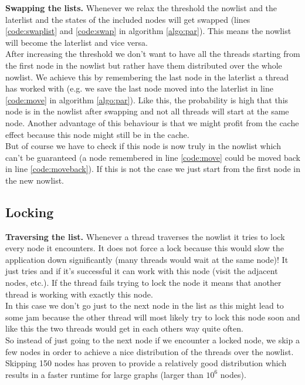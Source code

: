 \documentclass[letterpaper]{article}
\newcommand{\mypar}[1]{{\bf #1.}}
\begin{document}
\mypar{Swapping the lists}
Whenever we relax the threshold the nowlist and the laterlist and the states of the included nodes will get swapped (lines \ref{code:swaplist} and \ref{code:swap} in algorithm \ref{algo:par}). This means the nowlist will become the laterlist and vice versa.\\
After increasing the threshold we don't want to have all the threads starting from the first node in the nowlist but rather have them distributed over the whole nowlist. We achieve this by remembering the last node in the laterlist a thread has worked with (e.g. we save the last node moved into the laterlist in line \ref{code:move} in algorithm \ref{algo:par}). Like this, the probability is high that this node is in the nowlist after swapping and not all threads will start at the same node. Another advantage of this behaviour is that we might profit from the cache effect because this node might still be in the cache. \\
But of course we have to check if this node is now truly in the nowlist which can't be guaranteed (a node remembered in line \ref{code:move} could be moved back in line \ref{code:moveback}). If this is not the case we just start from the first node in the new nowlist.

\subsection{Locking}\label{ssec:lock}

\mypar{Traversing the list}
Whenever a thread traverses the nowlist it tries to lock every node it encounters. It does not force a lock because this would slow the application down significantly (many threads would wait at the same node)! It just tries and if it's successful it can work with this node (visit the adjacent nodes, etc.). If the thread fails trying to lock the node it means that another thread is working with exactly this node.\\
In this case we don't go just to the next node in the list as this might lead to some jam because the other thread will most likely try to lock this node soon and like this the two threads would get in each others way quite often.\\
So instead of just going to the next node if we encounter a locked node, we skip a few nodes in order to achieve a nice distribution of the threads over the nowlist. Skipping 150 nodes has proven to provide a relatively good distribution which results in a faster runtime for large graphs (larger than $10^6$ nodes).
\end{document}
